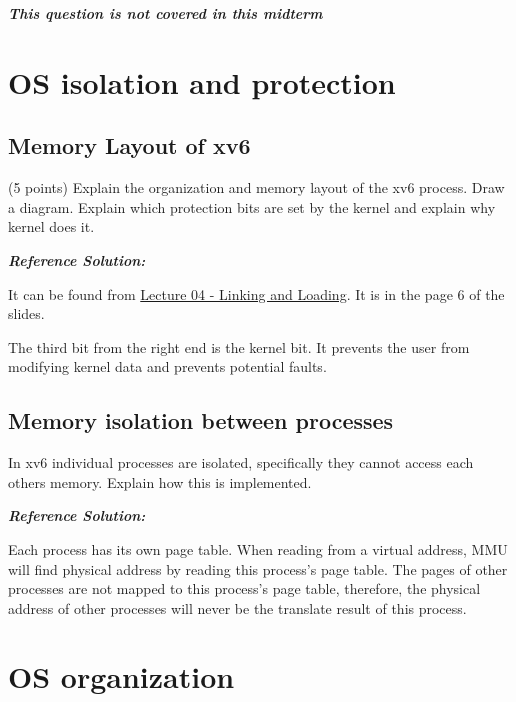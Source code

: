 \documentclass[]{article}
\begin{document}
\textbf{\emph{This question is not covered in this midterm}}

\hypertarget{os-isolation-and-protection}{%
\section{OS isolation and
protection}\label{os-isolation-and-protection}}

\hypertarget{memory-layout-of-xv6}{%
\subsection{Memory Layout of xv6}\label{memory-layout-of-xv6}}

(5 points) Explain the organization and memory layout of the xv6
process. Draw a diagram. Explain which protection bits are set by the
kernel and explain why kernel does it.

\textbf{\emph{Reference Solution:}}

It can be found from
\href{https://www.ics.uci.edu/~aburtsev/143A/lectures/lecture04-linking-and-loading/lecture04-linking-and-loading.pdf}{Lecture
04 - Linking and Loading}. It is in the page 6 of the slides.

The third bit from the right end is the kernel bit. It prevents the user
from modifying kernel data and prevents potential faults.

\hypertarget{memory-isolation-between-processes}{%
\subsection{Memory isolation between
processes}\label{memory-isolation-between-processes}}

In xv6 individual processes are isolated, specifically they cannot
access each others memory. Explain how this is implemented.

\textbf{\emph{Reference Solution:}}

Each process has its own page table. When reading from a virtual
address, MMU will find physical address by reading this process's page
table. The pages of other processes are not mapped to this process's
page table, therefore, the physical address of other processes will
never be the translate result of this process.

\hypertarget{os-organization}{%
\section{OS organization}\label{os-organization}}
\end{document}
